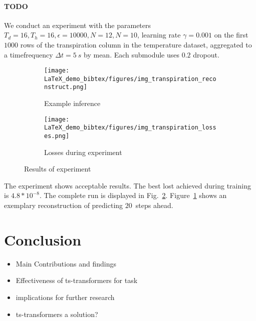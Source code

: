 \documentclass[11pt,a4paper]{article}
\begin{document}
\paragraph{TODO}
We conduct an experiment with the parameters $T_d=16,T_h=16,\epsilon = 10000,N=12,N=10$, learning rate $\gamma = 0.001$ on the first $1000$ rows of the transpiration column in the temperature dataset, aggregated to a timefrequency $\Delta t=5~s$ by mean. %
Each submodule uses $0.2$ dropout.
\begin{figure}%
    \centering
    \begin{subfigure}[b]{0.49\textwidth}
    \centering
    \texttt{[image: LaTeX\_demo\_bibtex/figures/img\_transpiration\_reconstruct.png]}
    \caption{Example inference}
    \label{fig:experiment_example_inference}
    \end{subfigure}
    \hfill
    \begin{subfigure}[b]{0.49\textwidth}
    \centering
    \texttt{[image: LaTeX\_demo\_bibtex/figures/img\_transpiration\_losses.png]}
    \caption{Losses during experiment}
    \label{fig:experiment_losses}
    \end{subfigure}

    \caption{Results of experiment}\label{fig:exp_results}
\end{figure}

The experiment shows acceptable results. 
The best lost achieved during training is $4.8*10^{-8}$.
The complete run is displayed in Fig.~\ref{fig:experiment_losses}.
Figure~\ref{fig:experiment_example_inference} shows an exemplary reconstruction of predicting $20$~steps ahead.

\section{Conclusion}
\begin{itemize}
    \item Main Contributions and findings
    \item Effectiveness of ts-transformers for task
    \item implications for further research
    \item ts-transformers a solution?
\end{itemize}



%
%
%

%
%
%




\end{document}

